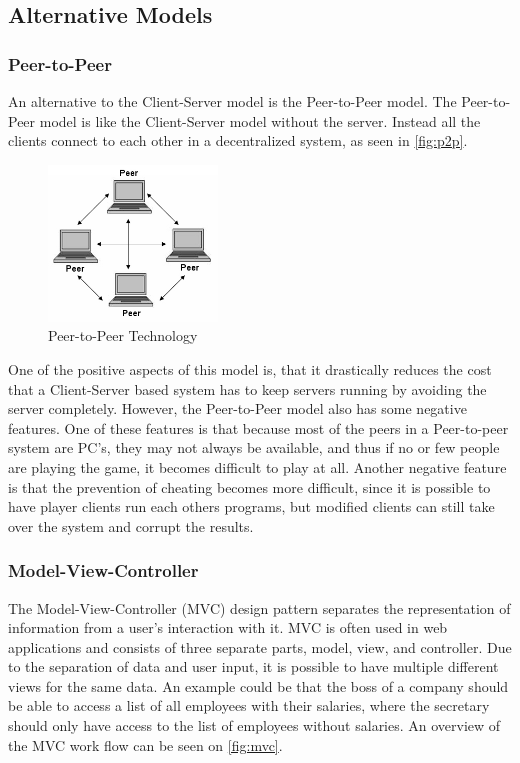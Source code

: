 \subsection{Alternative Models}
\subsubsection{Peer-to-Peer}
An alternative to the Client-Server model is the Peer-to-Peer model.
The Peer-to-Peer model is like the Client-Server model without the server.
Instead all the clients connect to each other in a decentralized system, as seen in \autoref{fig:p2p}.

\begin{figure}[ht]
  \centering
    \includegraphics[width=0.4\textwidth]{img/p2p.jpg}
  \caption{Peer-to-Peer Technology \citep{PeerToPeer}}
  \label{fig:p2p}
\end{figure}

One of the positive aspects of this model is, that it drastically reduces the cost that a Client-Server based system has to keep servers running by avoiding the server completely.
However, the Peer-to-Peer model also has some negative features.
One of these features is that because most of the peers in a Peer-to-peer system are PC's, they may not always be available, and thus if no or few people are playing the game, it becomes difficult to play at all.
Another negative feature is that the prevention of cheating becomes more difficult, since it is possible to have player clients run each others programs, but modified clients can still take over the system and corrupt the results.\newline

\subsubsection{Model-View-Controller}
The Model-View-Controller (MVC) design pattern separates the representation of information from a user's interaction with it.
MVC is often used in web applications and consists of three separate parts, model, view, and controller.
Due to the separation of data and user input, it is possible to have multiple different views for the same data.
An example could be that the boss of a company should be able to access a list of all employees with their salaries, where the secretary should only have access to the list of employees without salaries.
An overview of the MVC work flow can be seen on \autoref{fig:mvc}.\newline

